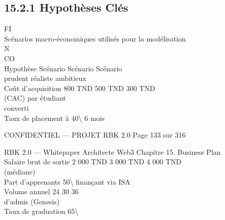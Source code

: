 \documentclass[12pt,landscape,a4paper]{article}
\newenvironment{confidential}
{\begin{tcolorbox}[
    colback=rbkred!5!white,
    colframe=rbkred!75!black,
    title=CONFIDENTIEL,
    fonttitle=\bfseries\color{white},
    coltitle=rbkred!75!black,
    breakable,
    enhanced,
    frame hidden,
    borderline west={2pt}{0pt}{rbkred!75!black}
]}
{\end{tcolorbox}}
\begin{document}
\subsection{15.2.1 Hypothèses Clés}
\vspace{0.5em}
\vspace{0.5em}
\vspace{0.5em}
\vspace{0.5em}
FI\\
Scénarios macro-économiques utilisés pour la modélisation\\
\vspace{0.5em}
N\\
CO\\
Hypothèse              Scénario      Scénario     Scénario\\
prudent        réaliste   ambitieux\\
Coût d’acquisition     800 TND       500 TND      300 TND\\
(CAC) par étudiant\\
converti\\
Taux de placement à      40\textbackslash{}%
6 mois\\
\vspace{0.5em}
\vspace{0.5em}
\vspace{0.5em}
\vspace{0.5em}
\begin{confidential}CONFIDENTIEL — PROJET RBK 2.0                                Page 133 sur 316\end{confidential}
RBK 2.0 — Whitepaper Architecte Web3                                                                          Chapitre 15. Business Plan\\
\vspace{0.5em}
\vspace{0.5em}
\vspace{0.5em}
Salaire brut de sortie   2 000 TND     3 000 TND   4 000 TND\\
(médiane)\\
Part d’apprenants           50\textbackslash{}%
finançant via ISA\\
Volume annuel                24             30        36\\
d’admis (Genesis)\\
Taux de graduation          65\textbackslash{}%
\end{document}
